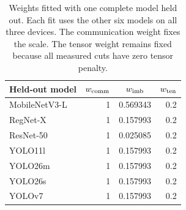 \begin{table}[t]
\centering
\small
\caption{Weights fitted with one complete model held out. Each fit uses the other six models on all three devices. The communication weight fixes the scale. The tensor weight remains fixed because all measured cuts have zero tensor penalty.}
\label{tab:weighted-folds}
\begin{tabular}{@{}lrD{.}{.}{6}D{.}{.}{1}@{}}
\toprule
Held-out model & {$w_{\rm comm}$} &  &  \\
\midrule
MobileNetV3-L & 1 & 0.569343 & 0.2 \\
RegNet-X & 1 & 0.157993 & 0.2 \\
ResNet-50 & 1 & 0.025085 & 0.2 \\
YOLO11l & 1 & 0.157993 & 0.2 \\
YOLO26m & 1 & 0.157993 & 0.2 \\
YOLO26s & 1 & 0.157993 & 0.2 \\
YOLOv7 & 1 & 0.157993 & 0.2 \\
\bottomrule
\end{tabular}
\end{table}
